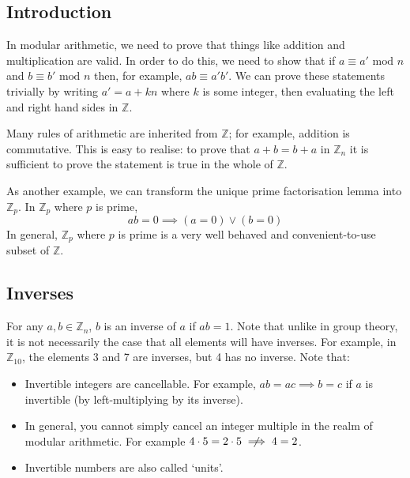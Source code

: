 \subsection{Introduction}
In modular arithmetic, we need to prove that things like addition and multiplication are valid.
In order to do this, we need to show that if \(a \equiv a' \text{ mod } n\) and \(b \equiv b' \text{ mod } n\) then, for example, \(ab \equiv a'b'\).
We can prove these statements trivially by writing \(a' = a + kn\) where \(k\) is some integer, then evaluating the left and right hand sides in \(\mathbb Z\).

Many rules of arithmetic are inherited from \(\mathbb Z\); for example, addition is commutative.
This is easy to realise: to prove that \(a + b = b + a\) in \(\mathbb Z_n\) it is sufficient to prove the statement is true in the whole of \(\mathbb Z\).

As another example, we can transform the unique prime factorisation lemma into \(\mathbb Z_p\).
In \(\mathbb Z_p\) where \(p\) is prime,
\[
	ab = 0 \implies (a = 0) \lor (b = 0)
\]
In general, \(\mathbb Z_p\) where \(p\) is prime is a very well behaved and convenient-to-use subset of \(\mathbb Z\).

\subsection{Inverses}
For any \(a, b \in \mathbb Z_n\), \(b\) is an inverse of \(a\) if \(ab=1\).
Note that unlike in group theory, it is not necessarily the case that all elements will have inverses.
For example, in \(\mathbb Z_{10}\), the elements 3 and 7 are inverses, but 4 has no inverse.
Note that:
\begin{itemize}
	\item Invertible integers are cancellable.
	      For example, \(ab=ac \implies b=c\) if \(a\) is invertible (by left-multiplying by its inverse).
	\item In general, you cannot simply cancel an integer multiple in the realm of modular arithmetic.
	      For example \(4 \cdot 5 = 2 \cdot 5 \centernot\implies 4 = 2\).
	\item Invertible numbers are also called `units'.
\end{itemize}

